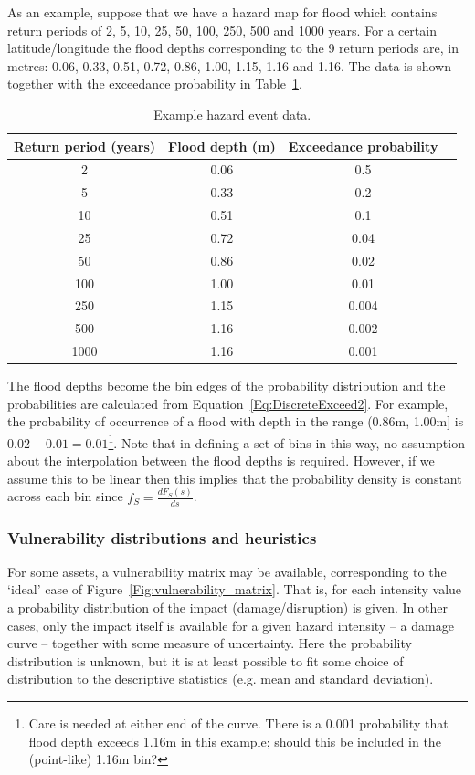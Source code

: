 \documentclass[a4paper,11pt]{extarticle} %
\begin{document}
As an example, suppose that we have a hazard map for flood which contains return periods of 2, 5, 10, 25, 50, 100, 250, 500 and 1000 years. For a certain latitude/longitude the flood depths corresponding to the 9 return periods are, in metres: 0.06, 0.33, 0.51, 0.72, 0.86, 1.00, 1.15, 1.16 and 1.16. The data is shown together with the exceedance probability in Table~\ref{Table:HazardData}. 

\begin{table}[ht]
	\caption{Example hazard event data.} 
	\centering 
	\begin{tabular}{c c c c} 
		\hline
		Return period (years) & Flood depth (m) & Exceedance probability  \\ [0.5ex] 
		\hline 
		2 & 0.06 & 0.5 \\
		5 & 0.33 & 0.2 \\ 
		10 & 0.51 & 0.1 \\ 
		25 & 0.72 & 0.04 \\ 
		50 & 0.86 & 0.02 \\ 
		100 & 1.00 & 0.01 \\ 
		250 & 1.15 & 0.004 \\ 
		500 & 1.16 & 0.002 \\ 
		1000 & 1.16 & 0.001 \\ 
		\hline 
	\end{tabular}
	\label{Table:HazardData} 
\end{table}

The flood depths become the bin edges of the probability distribution and the probabilities are calculated from Equation~\ref{Eq:DiscreteExceed2}. For example, the probability of occurrence of a flood with depth in the range (0.86m,  1.00m] is $0.02 - 0.01 = 0.01$\footnote{Care is needed at either end of the curve. There is a 0.001 probability that flood depth exceeds 1.16m in this example; should this be included in the (point-like) 1.16m bin?}. Note that in defining a set of bins in this way, no assumption about the interpolation between the flood depths is required. However, if we assume this to be linear then this implies that the probability density is constant across each bin since $f_S = \frac{dF_S(s)}{ds}$.


\subsubsection{Vulnerability distributions and heuristics}
For some assets, a vulnerability matrix may be available, corresponding to the `ideal' case  of Figure~\ref{Fig:vulnerability_matrix}. That is, for each intensity value a probability distribution of the impact (damage/disruption) is given. In other cases, only the impact itself is available for a given hazard intensity -- a damage curve -- together with some measure of uncertainty. Here the probability distribution is unknown, but it is at least possible to fit some choice of distribution to the descriptive statistics (e.g. mean and standard deviation).
\end{document}
